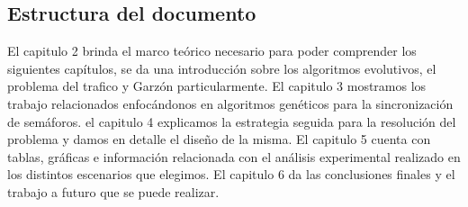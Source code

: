 \subsection{Estructura del documento}
El capitulo 2 brinda el marco teórico necesario para poder comprender los siguientes capítulos, se da una introducción sobre los algoritmos evolutivos, el problema del trafico y Garzón particularmente.
El capitulo 3 mostramos los trabajo relacionados enfocándonos en algoritmos genéticos para la sincronización de semáforos.
el capitulo 4 explicamos la estrategia seguida para la resolución del problema y damos en detalle el diseño de la misma.
El capitulo 5 cuenta con tablas, gráficas e información relacionada con el análisis experimental realizado en los distintos escenarios que elegimos.
El capitulo 6 da las conclusiones finales y el trabajo a futuro que se puede realizar.






